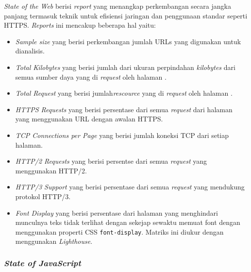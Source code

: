 \textit{State of the Web} berisi \textit{report} yang menangkap perkembangan \web secara jangka panjang  termasuk teknik untuk efisiensi jaringan dan penggunaan standar seperti HTTPS. \textit{Reports} ini mencakup beberapa hal yaitu:
\begin{itemize}
    \item \textit{Sample size} yang berisi perkembangan jumlah URLs yang digunakan untuk dianalisis.

    \item \textit{Total Kilobytes} yang berisi jumlah dari ukuran perpindahan \textit{kilobytes} dari semua sumber daya yang di \textit{request} oleh halaman \web.

    \item \textit{Total Request} yang berisi jumlah\textit{rescource} yang di \textit{request} oleh halaman \web.

    \item \textit{HTTPS Requests} yang berisi persentase dari semua \textit{request} dari halaman \web yang menggunakan URL dengan awalan HTTPS.

    \item \textit{TCP Connections per Page} yang berisi jumlah koneksi TCP dari setiap halaman.

    \item \textit{HTTP/2 Requests} yang berisi persentse dari semua \textit{request} yang menggunakan HTTP/2.

    \item \textit{HTTP/3 Support} yang berisi persentase dari semua \textit{request} yang mendukung protokol HTTP/3.

    \item \textit{Font Display} yang berisi persentase dari halaman yang menghindari munculnya teks tidak terlihat dengan sekejap sewaktu \web memuat font dengan menggunakan properti CSS \verb|font-display|. Matriks ini diukur dengan menggunakan \textit{Lighthouse}.

    
\end{itemize}

\subsubsection{\textit{State of JavaScript}}
\label{subsub:stateofjs}

